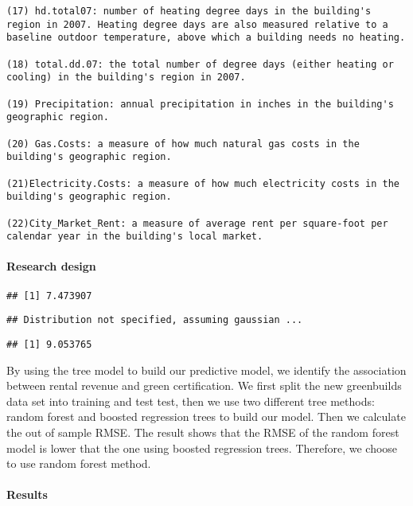 \documentclass[
]{article}
\begin{document}
\begin{verbatim}
(17) hd.total07: number of heating degree days in the building's region in 2007. Heating degree days are also measured relative to a baseline outdoor temperature, above which a building needs no heating.

(18) total.dd.07: the total number of degree days (either heating or cooling) in the building's region in 2007.

(19) Precipitation: annual precipitation in inches in the building's geographic region.

(20) Gas.Costs: a measure of how much natural gas costs in the building's geographic region.

(21)Electricity.Costs: a measure of how much electricity costs in the building's geographic region.

(22)City_Market_Rent: a measure of average rent per square-foot per calendar year in the building's local market.
\end{verbatim}

\hypertarget{research-design}{%
\paragraph{Research design}\label{research-design}}

\begin{verbatim}
## [1] 7.473907
\end{verbatim}

\begin{verbatim}
## Distribution not specified, assuming gaussian ...
\end{verbatim}

\begin{verbatim}
## [1] 9.053765
\end{verbatim}

By using the tree model to build our predictive model, we identify the
association between rental revenue and green certification. We first
split the new greenbuilds data set into training and test test, then we
use two different tree methods: random forest and boosted regression
trees to build our model. Then we calculate the out of sample RMSE. The
result shows that the RMSE of the random forest model is lower that the
one using boosted regression trees. Therefore, we choose to use random
forest method.

\hypertarget{results}{%
\paragraph{Results}\label{results}}
\end{document}
